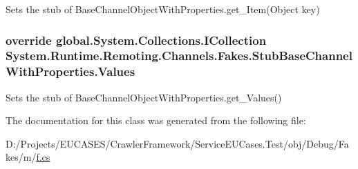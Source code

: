 Sets the stub of Base\-Channel\-Object\-With\-Properties.\-get\-\_\-\-Item(\-Object key)

\hypertarget{class_system_1_1_runtime_1_1_remoting_1_1_channels_1_1_fakes_1_1_stub_base_channel_with_properties_acde35394731e0c2fc30a0a4f4738621d}{
\subsubsection[{Values}]{\setlength{\rightskip}{0pt plus 5cm}override global.\-System.\-Collections.\-I\-Collection System.\-Runtime.\-Remoting.\-Channels.\-Fakes.\-Stub\-Base\-Channel\-With\-Properties.\-Values\hspace{0.3cm}{\ttfamily [get]}}}\label{class_system_1_1_runtime_1_1_remoting_1_1_channels_1_1_fakes_1_1_stub_base_channel_with_properties_acde35394731e0c2fc30a0a4f4738621d}


Sets the stub of Base\-Channel\-Object\-With\-Properties.\-get\-\_\-\-Values()



The documentation for this class was generated from the following file\-:\begin{DoxyCompactItemize}
\item 
D\-:/\-Projects/\-E\-U\-C\-A\-S\-E\-S/\-Crawler\-Framework/\-Service\-E\-U\-Cases.\-Test/obj/\-Debug/\-Fakes/m/\hyperlink{m_2f_8cs}{f.\-cs}\end{DoxyCompactItemize}
